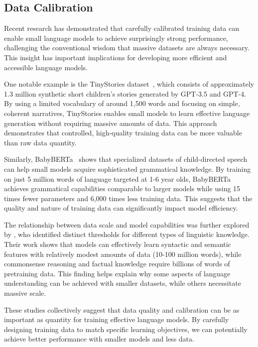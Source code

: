 \subsection{Data Calibration}

Recent research has demonstrated that carefully calibrated training data can enable small language models to achieve surprisingly strong performance, challenging the conventional wisdom that massive datasets are always necessary. This insight has important implications for developing more efficient and accessible language models.

One notable example is the TinyStories dataset~\citep{eldan2023tinystories}, which consists of approximately 1.3 million synthetic short children's stories generated by GPT-3.5 and GPT-4. By using a limited vocabulary of around 1,500 words and focusing on simple, coherent narratives, TinyStories enables small models to learn effective language generation without requiring massive amounts of data. This approach demonstrates that controlled, high-quality training data can be more valuable than raw data quantity.

Similarly, BabyBERTa~\citep{huebner2021babyberta} shows that specialized datasets of child-directed speech can help small models acquire sophisticated grammatical knowledge. By training on just 5 million words of language targeted at 1-6 year olds, BabyBERTa achieves grammatical capabilities comparable to larger models while using 15 times fewer parameters and 6,000 times less training data. This suggests that the quality and nature of training data can significantly impact model efficiency.

The relationship between data scale and model capabilities was further explored by \citet{zhang2021need}, who identified distinct thresholds for different types of linguistic knowledge. Their work shows that models can effectively learn syntactic and semantic features with relatively modest amounts of data (10-100 million words), while commonsense reasoning and factual knowledge require billions of words of pretraining data. This finding helps explain why some aspects of language understanding can be achieved with smaller datasets, while others necessitate massive scale.

These studies collectively suggest that data quality and calibration can be as important as quantity for training effective language models. By carefully designing training data to match specific learning objectives, we can potentially achieve better performance with smaller models and less data.

